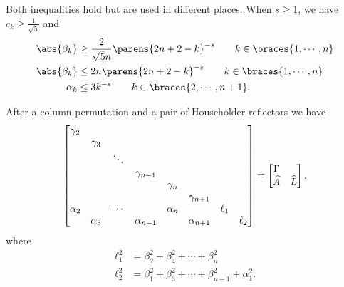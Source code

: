 %
Both inequalities hold but are used in different places.
When $s\ge1$, we have $c_{k}\ge\frac{1}{\sqrt{5}}$ and
%
\begin{align}
    \abs{\beta_{k}} &\ge \frac{2}{\sqrt{5}n}\parens{2n+2-k}^{-s} \qquad
        k\in\braces{1,\cdots,n} \nonumber\\
    \abs{\beta_{k}} &\le 2n\parens{2n+2-k}^{-s} \qquad
        k\in\braces{1,\cdots,n} \nonumber\\
    \alpha_{k} &\le 3k^{-s} \qquad k\in\braces{2,\cdots,n+1}.
    \label{eq:birkhoff_bdy_alpha_beta_bounds}
\end{align}



After a column permutation and a pair of Householder reflectors we have
%
\begin{equation}
    \setcounter{MaxMatrixCols}{20}
    \begin{bmatrix}
        \gamma_{2} & \\
        & \gamma_{3} & \\
        & & \ddots & \\
        & & & \gamma_{n-1} \\
        & & & & \gamma_{n} \\
        & & & & & \gamma_{n+1} \\
        \alpha_{2} & & \cdots & & \alpha_{n} & & \ell_{1} \\
        & \alpha_{3} & & \alpha_{n-1} & & \alpha_{n+1} &
            & \ell_{2} \\
    \end{bmatrix}
        = \begin{bmatrix} \Gamma & \\ \widehat{A} & \widehat{L} \end{bmatrix},
\end{equation}
%
where
%
\begin{align}
    \ell_{1}^{2} &= \beta_{2}^{2} + \beta_{4}^{2} + \cdots + \beta_{n}^{2}
        \nonumber\\
    \ell_{2}^{2} &= \beta_{1}^{2} + \beta_{3}^{2} + \cdots + \beta_{n-1}^{2}
            + \alpha_{1}^{2}.
\end{align}

